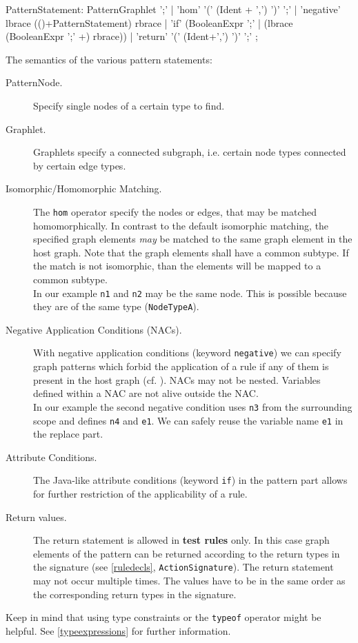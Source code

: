 \begin{rail}  
  PatternStatement: 
    PatternGraphlet ';' |
    'hom' '(' (Ident + ',') ')' ';' |
    'negative' lbrace (()+PatternStatement) rbrace |
    'if' (BooleanExpr ';' | (lbrace (BooleanExpr ';' +) rbrace)) |
    'return' '(' (Ident+',') ')' ';' ;
\end{rail}
The semantics of the various pattern statements:
\begin{description}
  \item[PatternNode.] Specify single nodes of a certain type to find.
  \item[Graphlet.] Graphlets specify a connected subgraph, i.e. certain node types connected by certain edge types.
  \item[Isomorphic/Homomorphic Matching.] The \texttt{hom} operator specify the nodes or edges, that may be matched homomorphically. In contrast to the default isomorphic matching, the specified graph elements \emph{may} be matched to the same graph element in the host graph. Note that the graph elements shall have a common subtype. If the match is not isomorphic, than the elements will be mapped to a common subtype.\\
  In our example \texttt{n1} and \texttt{n2} may be the same node. This is possible because they are of the  same type (\texttt{NodeTypeA}).
  \item[Negative Application Conditions (NACs).] With negative application conditions (keyword \texttt{negative}) we can specify graph patterns which forbid the application of a rule if any of them is present in the host graph (cf. \cite{adam}). NACs may not be nested. Variables defined within a NAC are not alive outside the NAC.\\
  In our example the second negative condition uses \texttt{n3} from the surrounding scope and defines \texttt{n4} and \texttt{e1}. We can safely reuse the variable name \texttt{e1} in the replace part.
  \item[Attribute Conditions.] The Java-like attribute conditions (keyword \texttt{if}) in the pattern part allows for further restriction of the applicability of a rule.
  \item[Return values.] The return statement is allowed in \textbf{test rules} only. In this case graph elements of the pattern can be returned according to the return types in the signature (see \ref{ruledecls}, \texttt{ActionSignature}). The return statement may not occur multiple times. The values have to be in the same order as the corresponding return types in the signature.
\end{description}
Keep in mind that using type constraints or the \texttt{typeof} operator might be helpful. See \ref{typeexpressions} for further information.

